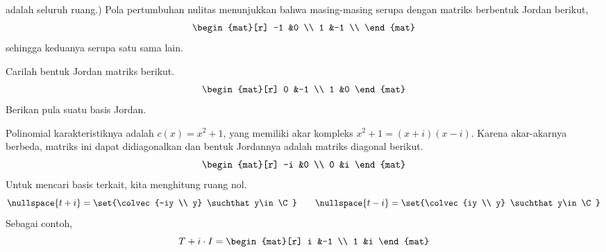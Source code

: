\begin{exercises}
\begin{answer}
        adalah seluruh ruang.)
        Pola pertumbuhan nulitas menunjukkan bahwa masing-masing
        serupa dengan matriks berbentuk Jordan berikut,
        \begin{equation*}
           \begin{mat}[r]
             -1  &0  \\
              1  &-1 \\
           \end{mat}
        \end{equation*}
        sehingga keduanya serupa satu sama lain.
      \end{answer}
  \item 
     Carilah bentuk Jordan matriks berikut.
     \begin{equation*}
        \begin{mat}[r]
           0  &-1  \\
           1  &0
        \end{mat}
     \end{equation*}
     Berikan pula suatu basis Jordan.
     \begin{answer}
       Polinomial karakteristiknya adalah
       \( c(x)=x^2+1 \), yang memiliki akar kompleks
       \( x^2+1=(x+i)(x-i) \).
       Karena akar-akarnya berbeda,
       matriks ini dapat didiagonalkan dan bentuk Jordannya adalah
       matriks diagonal berikut.
       \begin{equation*}
         \begin{mat}[r]
           -i  &0  \\
            0  &i
         \end{mat}
       \end{equation*}  
       Untuk mencari basis terkait, kita menghitung ruang nol.
       \begin{equation*}
         \nullspace{t+i}=\set{\colvec{-iy \\ y}
                                        \suchthat y\in\C} 
         \qquad
         \nullspace{t-i}=\set{\colvec{iy \\ y}
                                        \suchthat y\in\C} 
       \end{equation*}
       Sebagai contoh,
       \begin{equation*}
         T+i\cdot I=
         \begin{mat}[r]
           i  &-1  \\
           1  &i
         \end{mat}
       \end{equation*}

\end{answer}
\end{exercises}
